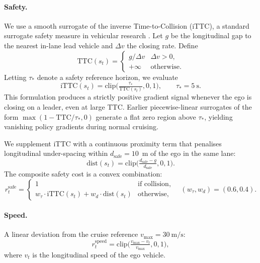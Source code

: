 \documentclass[12pt, letterpaper]{article}
\begin{document}
\paragraph{Safety.}
We use a smooth surrogate of the inverse Time-to-Collision (iTTC), a standard surrogate safety measure in vehicular research \cite{vogel2003ttc}. Let $g$ be the longitudinal gap to the nearest in-lane lead vehicle and $\Delta v$ the closing rate. Define
\begin{equation}
    \mathrm{TTC}(s_t) =
    \begin{cases}
        g/\Delta v & \Delta v > 0,\\
        +\infty & \text{otherwise.}
    \end{cases}
\end{equation}
Letting $\tau_{\!*}$ denote a safety reference horizon, we evaluate
\begin{equation}
    \mathrm{iTTC}(s_t) = \mathrm{clip}\!\Big(\tfrac{\tau_{\!*}}{\mathrm{TTC}(s_t)}, 0, 1\Big), \qquad \tau_{\!*} = 5~\text{s}.
\end{equation}
This formulation produces a strictly positive gradient signal whenever the ego is closing on a leader, even at large TTC. Earlier piecewise-linear surrogates of the form $\max(1-\mathrm{TTC}/\tau_{\!*},0)$ generate a flat zero region above $\tau_{\!*}$, yielding vanishing policy gradients during normal cruising.

We supplement iTTC with a continuous proximity term that penalises longitudinal under-spacing within $d_{\text{safe}}=10$~m of the ego in the same lane:
\begin{equation}
    \mathrm{dist}(s_t) = \mathrm{clip}\!\Big(\tfrac{d_{\text{safe}} - g}{d_{\text{safe}}}, 0, 1\Big).
\end{equation}
The composite safety cost is a convex combination:
\begin{equation}
    r_t^{\text{safe}} =
    \begin{cases}
        1 & \text{if collision},\\
        w_{\!\tau} \cdot \mathrm{iTTC}(s_t) + w_{d} \cdot \mathrm{dist}(s_t) & \text{otherwise},
    \end{cases}
    \quad (w_{\!\tau}, w_{d}) = (0.6, 0.4).
\end{equation}

\paragraph{Speed.}
A linear deviation from the cruise reference $v_{\max} = 30~\text{m/s}$:
\begin{equation}
    r_t^{\text{speed}} = \mathrm{clip}\!\Big(\tfrac{v_{\max} - v_t}{v_{\max}}, 0, 1\Big),
\end{equation}
where $v_t$ is the longitudinal speed of the ego vehicle.
\end{document}
